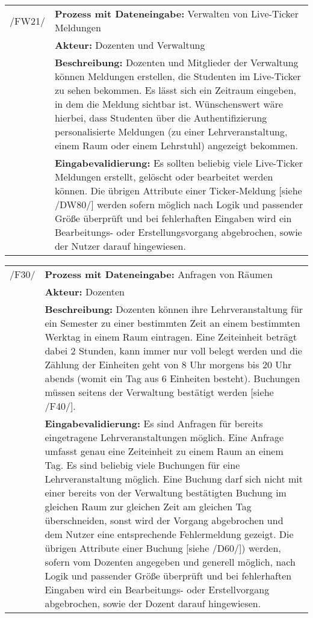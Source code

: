 \begin{tabular}{p{1.5cm}p{14.5cm}}
	
	 /FW21/& \textbf{Prozess mit Dateneingabe:} Verwalten von Live-Ticker Meldungen \\
				& \textbf{Akteur:} Dozenten und Verwaltung \\
				& \textbf{Beschreibung:} Dozenten und Mitglieder der Verwaltung können Meldungen erstellen, die Studenten im Live-Ticker zu sehen bekommen. Es lässt sich ein Zeitraum eingeben, in dem die Meldung sichtbar ist. Wünschenswert wäre hierbei, dass Studenten über die Authentifizierung personalisierte Meldungen (zu einer Lehrveranstaltung, einem Raum oder einem Lehrstuhl) angezeigt bekommen. \\
				& \textbf{Eingabevalidierung:} Es sollten beliebig viele Live-Ticker Meldungen erstellt, gelöscht oder bearbeitet werden können. Die übrigen Attribute einer Ticker-Meldung [siehe /DW80/] werden sofern möglich nach Logik und passender Größe überprüft und bei fehlerhaften Eingaben wird ein Bearbeitungs- oder Erstellungsvorgang abgebrochen, sowie der Nutzer darauf hingewiesen.\\[0.25cm]

\end{tabular}


\begin{tabular}{p{1.5cm}p{14.5cm}}
		
	 /F30/	& \textbf{Prozess mit Dateneingabe:} Anfragen von Räumen \\
				& \textbf{Akteur:} Dozenten \\
				& \textbf{Beschreibung:} Dozenten können ihre Lehrveranstaltung für ein Semester zu einer bestimmten Zeit an einem bestimmten Werktag in einem Raum eintragen. Eine Zeiteinheit beträgt dabei 2 Stunden, kann immer nur voll belegt werden und die Zählung der Einheiten geht von 8 Uhr morgens bis 20 Uhr abends (womit ein Tag aus 6 Einheiten besteht). Buchungen müssen seitens der Verwaltung bestätigt werden [siehe /F40/]. \\
				& \textbf{Eingabevalidierung:} Es sind Anfragen für bereits eingetragene Lehrveranstaltungen möglich. Eine Anfrage umfasst genau eine Zeiteinheit zu einem Raum an einem Tag. Es sind beliebig viele Buchungen für eine Lehrveranstaltung möglich. Eine Buchung darf sich nicht mit einer bereits von der Verwaltung bestätigten Buchung im gleichen Raum zur gleichen Zeit am gleichen Tag überschneiden, sonst wird der Vorgang abgebrochen und dem Nutzer eine entsprechende Fehlermeldung gezeigt. Die übrigen Attribute einer Buchung [siehe /D60/]) werden, sofern vom Dozenten angegeben und generell möglich, nach Logik und passender Größe überprüft und bei fehlerhaften Eingaben wird ein Bearbeitungs- oder Erstellvorgang abgebrochen, sowie der Dozent darauf hingewiesen.\\[0.25cm]

\end{tabular}


